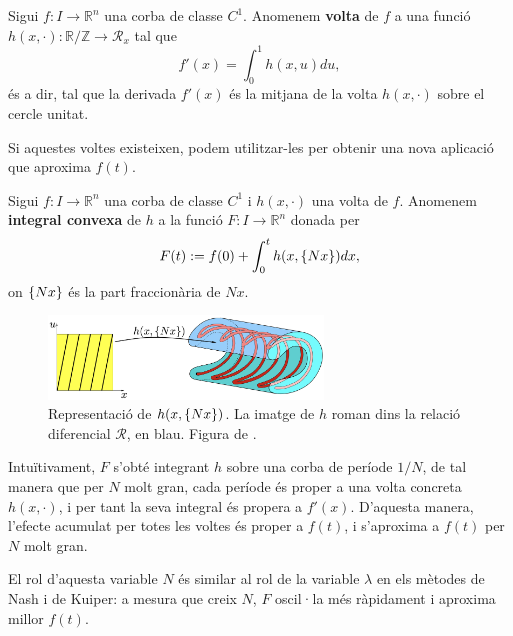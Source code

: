 \begin{defi}
    Sigui $f:I\to\mathbb R^n$ una corba de classe $C^1$. Anomenem \textbf{volta} de $f$ a una funció $h(x, \cdot): \mathbb R / \mathbb Z \to \mathcal R_x$ tal que
    \begin{equation}\label{eq:def voltes}
        f'(x) = \int_0^1 h(x, u)  du,
    \end{equation}
    és a dir, tal que la derivada $f'(x)$ és la mitjana de la volta $h(x, \cdot)$ sobre el cercle unitat.
\end{defi}

Si aquestes voltes existeixen, podem utilitzar-les per obtenir una nova aplicació que aproxima $f(t)$.
\begin{defi}
    Sigui $f:I\to\mathbb R^n$ una corba de classe $C^1$ i $h(x, \cdot)$ una volta de $f$. Anomenem \textbf{integral convexa} de $h$ a la funció $F:I\to\mathbb R^n$ donada per
    \begin{equation*}
        F(t) := f(0) + \int_0^t h(x, \{Nx\})  dx,
    \end{equation*}
    on $\{Nx\}$ és la part fraccionària de $Nx$.
\end{defi}    

\begin{figure}[htbp]
    \centering
    \includegraphics[width=0.65\textwidth]{voltes.png}
    \caption{Representació de $h(x,\{Nx\})$. La imatge de $h$ roman dins la relació diferencial $\mathcal R$, en blau. Figura de \citet{borrelli2013}.}
    \label{fig:cinquena_foto}
\end{figure}

Intuïtivament, $F$ s'obté integrant $h$ sobre una corba de període $1/N$, de tal manera que per $N$ molt gran, cada període és proper a una volta concreta $h(x, \cdot)$, i per tant la seva integral és propera a $f'(x)$. D'aquesta manera, l'efecte acumulat per totes les voltes és proper a $f(t)$, i s'aproxima a $f(t)$ per $N$ molt gran. 
\begin{obs}
    El rol d'aquesta variable $N$ és similar al rol de la variable $\lambda$ en els mètodes de Nash i de Kuiper: a mesura que creix $N$, $F$ oscil·la més ràpidament i aproxima millor $f(t)$.
\end{obs}

